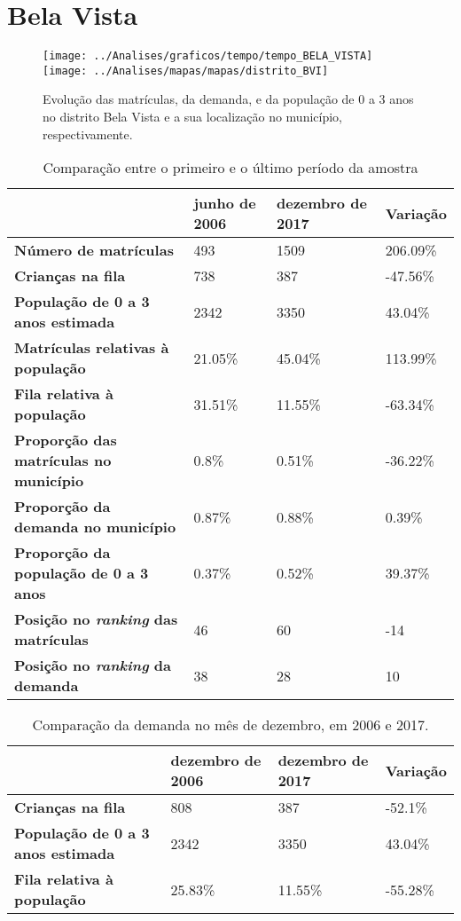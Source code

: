 \section{Bela Vista}
\begin{figure}[H]
\centering
\texttt{[image: ../Analises/graficos/tempo/tempo\_BELA\_VISTA]}
\texttt{[image: ../Analises/mapas/mapas/distrito\_BVI]}
\caption{Evolução das matrículas, da demanda, e da população de 0 a 3 anos no distrito Bela Vista e a sua localização no município, respectivamente.}
\end{figure}
\begin{table}[H]
\begin{tabular}{l|l|l|l}
\textbf{}                                      & \textbf{junho de 2006}       & \textbf{dezembro de 2017}    & \textbf{Variação} \\ \hline
\textbf{Número de matrículas}                  & 493 & 1509 & 206.09\% \\ \hline
\textbf{Crianças na fila}                      & 738 & 387 & -47.56\% \\ \hline
\textbf{População de 0 a 3 anos estimada}      & 2342 & 3350 & 43.04\% \\ \hline
\textbf{Matrículas relativas à população}      & 21.05\% & 45.04\% & 113.99\% \\ \hline
\textbf{Fila relativa à população}             & 31.51\% & 11.55\% & -63.34\% \\ \hline
\textbf{Proporção das matrículas no município} & 0.8\% & 0.51\% & -36.22\% \\ \hline
\textbf{Proporção da demanda no município}     & 0.87\% & 0.88\% & 0.39\% \\ \hline
\textbf{Proporção da população de 0 a 3 anos}  & 0.37\% & 0.52\% & 39.37\% \\ \hline
\textbf{Posição no \textit{ranking} das matrículas}     & 46 & 60 & -14 \\ \hline
\textbf{Posição no \textit{ranking} da demanda}         & 38 & 28 & 10 \\ 
\end{tabular}
\caption{Comparação entre o primeiro e o último período da amostra}
\end{table}
\begin{table}[H]
\begin{tabular}{l|l|l|l}
\textbf{}                                 & \textbf{dezembro de 2006} & \textbf{dezembro de 2017} & \textbf{Variação} \\ \hline
\textbf{Crianças na fila}                      & 808 & 387 & -52.1\% \\ \hline
\textbf{População de 0 a 3 anos estimada}      & 2342 & 3350 & 43.04\% \\ \hline
\textbf{Fila relativa à população}             & 25.83\% & 11.55\% & -55.28\% \\
\end{tabular}
\caption{Comparação da demanda no mês de dezembro, em 2006 e 2017.}
\end{table}
